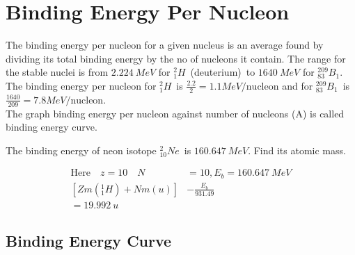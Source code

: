 \section{Binding Energy Per Nucleon}
The binding energy per nucleon for a given nucleus is an average found by dividing its total binding energy by the no of nucleons it contain. The range for the stable nuclei is from $2.224\ MeV$ for $^2_1H$\ (deuterium)\ to $1640\ MeV$ for $^{209}_{83}B_1$. The binding energy per nucleon for $^2_1H$\ is $\frac{2.2}{2}=1.1MeV/\text{nucleon}$ and for $^{209}_{83}B_1$\ is $\frac{1640}{209}=7.8 MeV/\text{nucleon}$.\\
The graph binding energy per nucleon against number of nucleons (A) is called binding energy curve.
\begin{exercise}
	The binding energy of neon isotope $^2_{10}Ne$\ is $160.647\ MeV$. Find its atomic mass.
\end{exercise}
\begin{answer}
	\begin{align*}
	\text{Here}\quad z=10\quad N&=10,E_b=160.647 \ MeV\\
	\left[ Zm(^1_1H)+Nm(u)\right] &-\frac{E_b}{931.49}\\
	=19.992 \ u
	\end{align*}
\end{answer}
\subsection{Binding Energy Curve}
